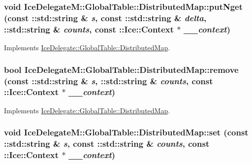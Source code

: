 \hypertarget{class_ice_delegate_m_1_1_global_table_1_1_distributed_map_adc403dbc33076ea6b12c26992aba5026}{
\subsubsection[{putNget}]{\setlength{\rightskip}{0pt plus 5cm}void IceDelegateM::GlobalTable::DistributedMap::putNget (const ::std::string \& {\em s}, \/  const ::std::string \& {\em delta}, \/  ::std::string \& {\em counts}, \/  const ::Ice::Context $\ast$ {\em \_\-\_\-context})}}
\label{class_ice_delegate_m_1_1_global_table_1_1_distributed_map_adc403dbc33076ea6b12c26992aba5026}


Implements \hyperlink{class_ice_delegate_1_1_global_table_1_1_distributed_map_a41847e7af4589564ef39469d2628a09c}{IceDelegate::GlobalTable::DistributedMap}.

\hypertarget{class_ice_delegate_m_1_1_global_table_1_1_distributed_map_a12d1244d77d87ecc420b3fb020f22af4}{
\subsubsection[{remove}]{\setlength{\rightskip}{0pt plus 5cm}bool IceDelegateM::GlobalTable::DistributedMap::remove (const ::std::string \& {\em s}, \/  ::std::string \& {\em counts}, \/  const ::Ice::Context $\ast$ {\em \_\-\_\-context})}}
\label{class_ice_delegate_m_1_1_global_table_1_1_distributed_map_a12d1244d77d87ecc420b3fb020f22af4}


Implements \hyperlink{class_ice_delegate_1_1_global_table_1_1_distributed_map_aa0616738a0cfb246e9e9921629c8dbd3}{IceDelegate::GlobalTable::DistributedMap}.

\hypertarget{class_ice_delegate_m_1_1_global_table_1_1_distributed_map_a0b04a83967513107ea86902bd22d57e1}{
\subsubsection[{set}]{\setlength{\rightskip}{0pt plus 5cm}void IceDelegateM::GlobalTable::DistributedMap::set (const ::std::string \& {\em s}, \/  const ::std::string \& {\em counts}, \/  const ::Ice::Context $\ast$ {\em \_\-\_\-context})}}
\label{class_ice_delegate_m_1_1_global_table_1_1_distributed_map_a0b04a83967513107ea86902bd22d57e1}


